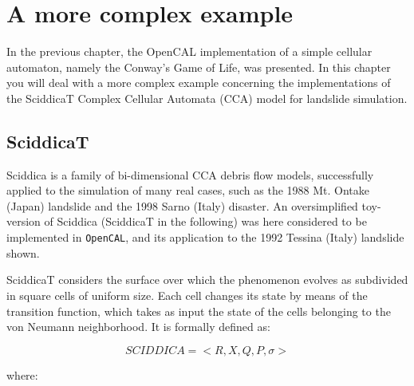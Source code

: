 \section{A more complex example}

In the previous chapter, the OpenCAL implementation of a simple
cellular automaton, namely the Conway’s Game of Life, was
presented. In this chapter you will deal with a more complex example
concerning the implementations of the SciddicaT Complex Cellular
Automata (CCA) model for landslide simulation.

\subsection{SciddicaT}
Sciddica is a family of bi-dimensional CCA debris flow models,
successfully applied to the simulation of many real cases, such as the
1988 Mt. Ontake (Japan) landslide and the 1998 Sarno (Italy)
disaster. An oversimplified toy-version of Sciddica (SciddicaT in the
following) was here considered to be implemented in \verb"OpenCAL",
and its application to the 1992 Tessina (Italy) landslide shown.

SciddicaT considers the surface over which the phenomenon evolves as
subdivided in square cells of uniform size. Each cell changes its
state by means of the transition function, which takes as input the
state of the cells belonging to the von Neumann neighborhood. It is
formally defined as:

$$SCIDDICA = < R, X, Q , P, \sigma  >$$

where:

